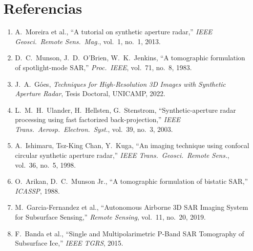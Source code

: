 \documentclass[12pt,a4paper,oneside]{book}
\begin{document}
\backmatter
\chapter*{Referencias}

\begin{enumerate}
  \item A.\ Moreira et al., ``A tutorial on synthetic aperture radar,'' \emph{IEEE Geosci.\ Remote Sens.\ Mag.}, vol.\ 1, no.\ 1, 2013.
  \item D.\ C.\ Munson, J.\ D.\ O'Brien, W.\ K.\ Jenkins, ``A tomographic formulation of spotlight-mode SAR,'' \emph{Proc.\ IEEE}, vol.\ 71, no.\ 8, 1983.
  \item J.\ A.\ Góes, \emph{Techniques for High-Resolution 3D Images with Synthetic Aperture Radar}, Tesis Doctoral, UNICAMP, 2022.
  \item L.\ M.\ H.\ Ulander, H.\ Hellsten, G.\ Stenstrom, ``Synthetic-aperture radar processing using fast factorized back-projection,'' \emph{IEEE Trans.\ Aerosp.\ Electron.\ Syst.}, vol.\ 39, no.\ 3, 2003.
  \item A.\ Ishimaru, Tsz-King Chan, Y.\ Kuga, ``An imaging technique using confocal circular synthetic aperture radar,'' \emph{IEEE Trans.\ Geosci.\ Remote Sens.}, vol.\ 36, no.\ 5, 1998.
  \item O.\ Arikan, D.\ C.\ Munson Jr., ``A tomographic formulation of bistatic SAR,'' \emph{ICASSP}, 1988.
  \item M.\ Garcia-Fernandez et al., ``Autonomous Airborne 3D SAR Imaging System for Subsurface Sensing,'' \emph{Remote Sensing}, vol.\ 11, no.\ 20, 2019.
  \item F.\ Banda et al., ``Single and Multipolarimetric P-Band SAR Tomography of Subsurface Ice,'' \emph{IEEE TGRS}, 2015.
\end{enumerate}
\end{document}
